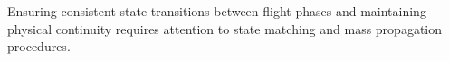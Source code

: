 Ensuring consistent state transitions between flight phases and maintaining physical continuity requires attention to state matching and mass propagation procedures.

